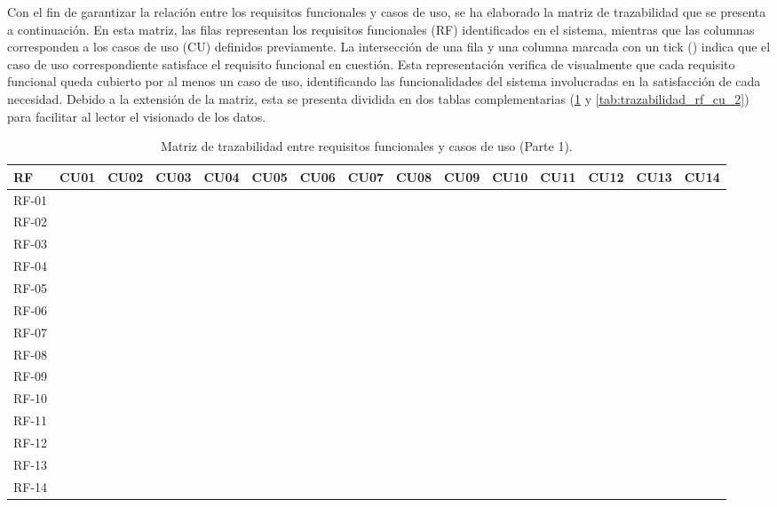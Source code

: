 Con el fin de garantizar la relación entre los requisitos funcionales y casos de uso, se ha elaborado la matriz de trazabilidad que se presenta a continuación. En esta matriz, las filas representan los requisitos funcionales (RF) identificados en el sistema, mientras que las columnas corresponden a los casos de uso (CU) definidos previamente. La intersección de una fila y una columna marcada con un tick (\checkmark) indica que el caso de uso correspondiente satisface el requisito funcional en cuestión. Esta representación verifica de visualmente que cada requisito funcional queda cubierto por al menos un caso de uso, identificando las funcionalidades del sistema involucradas en la satisfacción de cada necesidad. Debido a la extensión de la matriz, esta se presenta dividida en dos tablas complementarias (\ref{tab:trazabilidad_rf_cu_1} y \ref{tab:trazabilidad_rf_cu_2}) para facilitar al lector el visionado de los datos.

\begin{table}[H]
	\centering
	\caption{Matriz de trazabilidad entre requisitos funcionales y casos de uso (Parte 1).}
	\label{tab:trazabilidad_rf_cu_1}
	\scriptsize
	\setlength{\tabcolsep}{3pt}
	\begin{tabularx}{\textwidth}{l *{14}{c}}
		\toprule
		\textbf{RF} & \textbf{CU01} & \textbf{CU02} & \textbf{CU03} & \textbf{CU04} & \textbf{CU05} & \textbf{CU06} & \textbf{CU07} & \textbf{CU08} & \textbf{CU09} & \textbf{CU10} & \textbf{CU11} & \textbf{CU12} & \textbf{CU13} & \textbf{CU14} \\
		\midrule
		RF-01 & \checkmark & & & \checkmark & & & & & & & & & & \\
		\addlinespace
		RF-02 & & & & \checkmark & & & & & & & & & & \\
		\addlinespace
		RF-03 & & & & \checkmark & \checkmark & \checkmark & \checkmark & \checkmark & & & & & & \\
		\addlinespace
		RF-04 & & & & \checkmark & \checkmark & \checkmark & & & & & & & & \\
		\addlinespace
		RF-05 & & & & \checkmark & & & \checkmark & \checkmark & & & & & & \\
		\addlinespace
		RF-06 & \checkmark & & & & & & & & & & & & & \\
		\addlinespace
		RF-07 & & \checkmark & & & & & & & & & & & & \\
		\addlinespace
		RF-08 & & & \checkmark & & & & & & & & & & & \\
		\addlinespace
		RF-09 & & \checkmark & & & & & & & \checkmark & & & & & \\
		\addlinespace
		RF-10 & & & & & & & & & & \checkmark & & & & \\
		\addlinespace
		RF-11 & & & & & & & & & \checkmark & & & & & \\
		\addlinespace
		RF-12 & & & & & & & & & & & \checkmark & & & \\
		\addlinespace
		RF-13 & & & & & & & & & & & & \checkmark & \checkmark & \checkmark \\
		\addlinespace
		RF-14 & & & & & & & & & & & & & & \\
		\bottomrule
	\end{tabularx}
\end{table}

